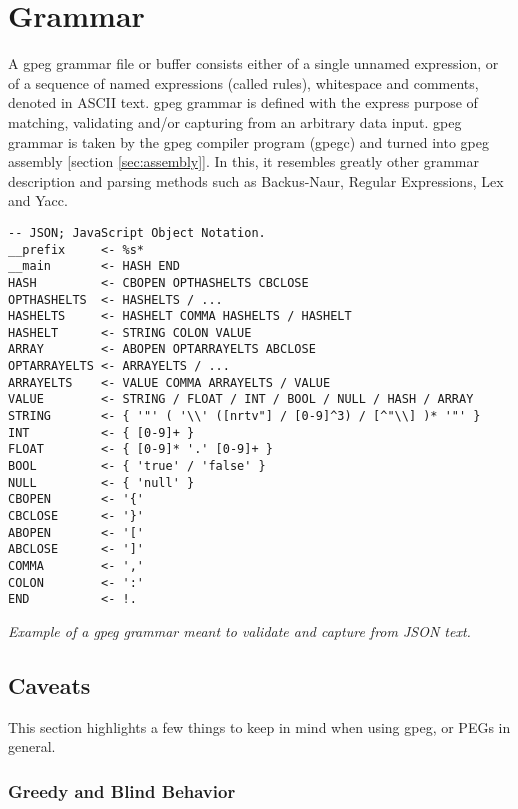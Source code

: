 \section{Grammar}
\label{sec:grammar}

A gpeg grammar file or buffer consists either of a single
unnamed expression, or of a sequence of named expressions (called rules),
whitespace and comments, denoted in ASCII text.
gpeg grammar is defined with the express purpose of matching, validating
and/or capturing from an arbitrary data input.
gpeg grammar is taken by the gpeg compiler program (gpegc) and turned
into gpeg assembly [section \ref{sec:assembly}].
In this, it resembles greatly other grammar description and parsing methods
such as Backus-Naur, Regular Expressions, Lex and Yacc.

\begin{myquote}
\begin{verbatim}
-- JSON; JavaScript Object Notation.
__prefix     <- %s*
__main       <- HASH END
HASH         <- CBOPEN OPTHASHELTS CBCLOSE
OPTHASHELTS  <- HASHELTS / ...
HASHELTS     <- HASHELT COMMA HASHELTS / HASHELT
HASHELT      <- STRING COLON VALUE
ARRAY        <- ABOPEN OPTARRAYELTS ABCLOSE
OPTARRAYELTS <- ARRAYELTS / ...
ARRAYELTS    <- VALUE COMMA ARRAYELTS / VALUE
VALUE        <- STRING / FLOAT / INT / BOOL / NULL / HASH / ARRAY
STRING       <- { '"' ( '\\' ([nrtv"] / [0-9]^3) / [^"\\] )* '"' }
INT          <- { [0-9]+ }
FLOAT        <- { [0-9]* '.' [0-9]+ }
BOOL         <- { 'true' / 'false' }
NULL         <- { 'null' }
CBOPEN       <- '{'
CBCLOSE      <- '}'
ABOPEN       <- '['
ABCLOSE      <- ']'
COMMA        <- ','
COLON        <- ':'
END          <- !.
\end{verbatim}
\end{myquote}
\textit{Example of a gpeg grammar meant to validate and capture from
JSON\cite{bib:json} text.}

\subsection{Caveats}

This section highlights a few things to keep in mind when using
gpeg, or PEGs in general.

\subsubsection{Greedy and Blind Behavior}

